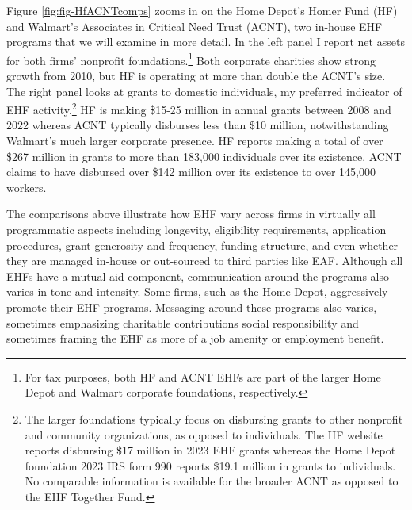 \documentclass[
  11pt,
  oneside]{article}
\begin{document}
Figure \ref{fig:fig-HfACNTcomps} zooms in on the Home Depot's Homer Fund (HF) and Walmart's Associates in Critical Need Trust (ACNT), two in-house EHF programs that we will examine in more detail. In the left panel I report net assets for both firms' nonprofit foundations.\footnote{For tax purposes, both HF and ACNT EHFs are part of the larger Home Depot and Walmart corporate foundations, respectively.} Both corporate charities show strong growth from 2010, but HF is operating at more than double the ACNT's size. The right panel looks at grants to domestic individuals, my preferred indicator of EHF activity.\footnote{The larger foundations typically focus on disbursing grants to other nonprofit and community organizations, as opposed to individuals. The HF website reports disbursing \$17 million in 2023 EHF grants whereas the Home Depot foundation 2023 IRS form 990 reports \$19.1 million in grants to individuals. No comparable information is available for the broader ACNT as opposed to the EHF Together Fund.} HF is making \$15-25 million in annual grants between 2008 and 2022 whereas ACNT typically disburses less than \$10 million, notwithstanding Walmart's much larger corporate presence. HF reports making a total of over \$267 million in grants to more than 183,000 individuals over its existence. ACNT claims to have disbursed over \$142 million over its existence to over 145,000 workers.

The comparisons above illustrate how EHF vary across firms in virtually all programmatic aspects including longevity, eligibility requirements, application procedures, grant generosity and frequency, funding structure, and even whether they are managed in-house or out-sourced to third parties like EAF. Although all EHFs have a mutual aid component, communication around the programs also varies in tone and intensity. Some firms, such as the Home Depot, aggressively promote their EHF programs. Messaging around these programs also varies, sometimes emphasizing charitable contributions social responsibility and sometimes framing the EHF as more of a job amenity or employment benefit.
\end{document}

